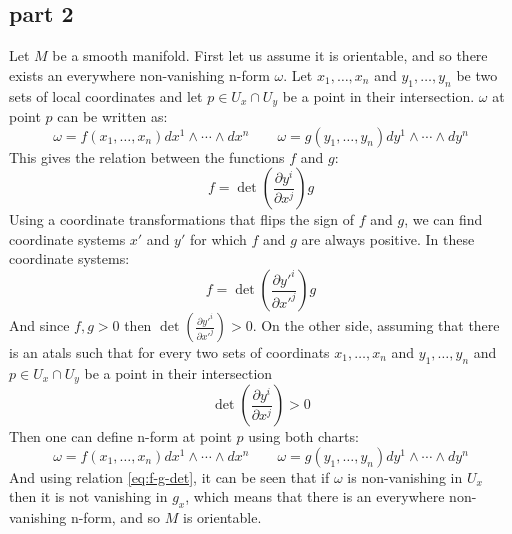 \documentclass{article}
\begin{document}
\subsection*{part 2}
Let $M$ be a smooth manifold. First let us assume it is orientable, and so there exists an everywhere non-vanishing n-form $\omega$. Let $x_1, \dots, x_n$ and $y_1, \dots, y_n$ be two sets of local coordinates and let $p \in U_x \cap U_y$ be a point in their intersection. $\omega$ at point $p$ can be written as:
\begin{equation}
    \omega = f(x_1, \dots, x_n) dx^1 \wedge \cdots \wedge dx^n
    \qquad
    \omega = g(y_1, \dots, y_n) dy^1 \wedge \cdots \wedge dy^n
\end{equation}
This gives the relation between the functions $f$ and $g$:
\begin{equation}
\label{eq:f-g-det}
    f = \det(\frac{\partial y^i}{\partial x^j})g
\end{equation}
Using a coordinate transformations that flips the sign of $f$ and $g$, we can find coordinate systems $x'$ and $y'$ for which $f$ and $g$ are always positive. In these coordinate systems:
\begin{equation}
    f = \det(\frac{\partial y'^i}{\partial x'^j})g
\end{equation}
And since $f, g > 0$ then $\det(\frac{\partial y'^i}{\partial x'^j}) > 0$. On the other side, assuming that there is an atals such that for every two sets of coordinats $x_1, \dots, x_n$ and $y_1, \dots, y_n$ and $p \in U_x \cap U_y$ be a point in their intersection
\begin{equation}
    \det(\frac{\partial y^i}{\partial x^j}) > 0
\end{equation}
Then one can define n-form at point $p$ using both charts:
\begin{equation}
    \omega = f(x_1, \dots, x_n) dx^1 \wedge \cdots \wedge dx^n
    \qquad
    \omega = g(y_1, \dots, y_n) dy^1 \wedge \cdots \wedge dy^n
\end{equation}
And using relation \ref{eq:f-g-det}, it can be seen that if $\omega$ is non-vanishing in $U_x$ then it is not vanishing in $g_x$, which means that there is an everywhere non-vanishing n-form, and so $M$ is orientable.
\end{document}

